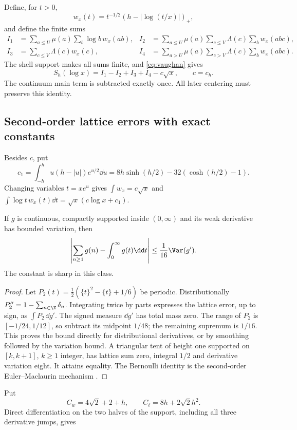 Define, for $t>0$,
\[
w_x(t)=t^{-1/2}(h-|\log(t/x)|)_+,
\]
and define the finite sums
\begin{align*}
I_1&=\sum_{a\le U}\mu(a)\sum_b\log b\,w_x(ab),&
I_2&=\sum_{a\le U}\mu(a)\sum_{c\le V}\Lambda(c)\sum_b w_x(abc),\\
I_3&=\sum_{c\le V}\Lambda(c)w_x(c),&
I_4&=\sum_{a>U}\mu(a)\sum_{c>V}\Lambda(c)\sum_b w_x(abc).
\end{align*}
The shell support makes all sums finite, and \eqref{eq:vaughan} gives
\begin{equation}\label{eq:Is}
S_h(\log x)=I_1-I_2+I_3+I_4-c\sqrt x,\qquad c=c_h.
\end{equation}
The continuum main term is subtracted exactly once. All later centering must preserve this identity.

\subsection{Second-order lattice errors with exact constants}
Besides $c$, put
\[
c_1=\int_{-h}^h u(h-|u|)e^{u/2}\dd u=8h\sinh(h/2)-32(\cosh(h/2)-1).
\]
Changing variables $t=xe^u$ gives $\int w_x=c\sqrt x$ and $\int\log t\,w_x(t)\dd t=\sqrt x(c\log x+c_1)$.
\begin{lemma}\label{lem:quad}
If $g$ is continuous, compactly supported inside $(0,\infty)$ and its weak derivative has bounded variation, then
\[
\left|\sum_{n\ge1}g(n)-\int_0^\infty g(t)\dd t\right|\le\frac1{16}\Var(g').
\]
The constant is sharp in this class.
\end{lemma}
\begin{proof}
Let $P_2(t)=\tfrac12(\{t\}^2-\{t\}+1/6)$ be periodic. Distributionally $P_2''=1-\sum_{n\in\Z}\delta_n$. Integrating twice by parts expresses the lattice error, up to sign, as $\int P_2\,\dd g'$. The signed measure $\dd g'$ has total mass zero. The range of $P_2$ is $[-1/24,1/12]$, so subtract its midpoint $1/48$; the remaining supremum is $1/16$. This proves the bound directly for distributional derivatives, or by smoothing followed by the variation bound. A triangular tent of height one supported on $[k,k+1]$, $k\ge1$ integer, has lattice sum zero, integral $1/2$ and derivative variation eight. It attains equality. The Bernoulli identity is the second-order Euler--Maclaurin mechanism \cite{eulermac}.
\end{proof}
Put
\[
C_w=4\sqrt2+2+h,\qquad C_\ell=8h+2\sqrt2h^2.
\]
Direct differentiation on the two halves of the support, including all three derivative jumps, gives
